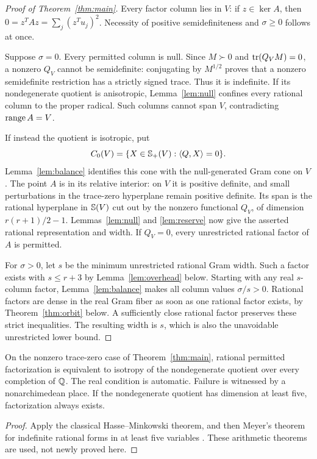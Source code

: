 \begin{proof}[Proof of Theorem~\ref{thm:main}]
Every factor column lies in $V$: if $z\in\ker A$, then $0=z^TAz=\sum_j(z^Tu_j)^2$. Necessity of positive semidefiniteness and $\sigma\geq0$ follows at once.

Suppose $\sigma=0$. Every permitted column is null. Since $M\succ0$ and $\operatorname{tr}(Q_VM)=0$, a nonzero $Q_V$ cannot be semidefinite: conjugating by $M^{1/2}$ proves that a nonzero semidefinite restriction has a strictly signed trace. Thus it is indefinite. If its nondegenerate quotient is anisotropic, Lemma~\ref{lem:null} confines every rational column to the proper radical. Such columns cannot span $V$, contradicting $\operatorname{range} A=V$.

If instead the quotient is isotropic, put
\[
 C_0(V)=\{X\in\mathbb S_+(V):\langle Q,X\rangle=0\}.
\]
Lemma~\ref{lem:balance} identifies this cone with the null-generated Gram cone on $V$. The point $A$ is in its relative interior: on $V$ it is positive definite, and small perturbations in the trace-zero hyperplane remain positive definite. Its span is the rational hyperplane in $\mathbb S(V)$ cut out by the nonzero functional $Q_V$, of dimension $r(r+1)/2-1$. Lemmas~\ref{lem:null} and \ref{lem:reserve} now give the asserted rational representation and width. If $Q_V=0$, every unrestricted rational factor of $A$ is permitted.

For $\sigma>0$, let $s$ be the minimum unrestricted rational Gram width. Such a factor exists with $s\leq r+3$ by Lemma~\ref{lem:overhead} below. Starting with any real $s$-column factor, Lemma~\ref{lem:balance} makes all column values $\sigma/s>0$. Rational factors are dense in the real Gram fiber as soon as one rational factor exists, by Theorem~\ref{thm:orbit} below. A sufficiently close rational factor preserves these strict inequalities. The resulting width is $s$, which is also the unavoidable unrestricted lower bound.
\end{proof}

\begin{corollary}\label{cor:localglobal}
On the nonzero trace-zero case of Theorem~\ref{thm:main}, rational permitted factorization is equivalent to isotropy of the nondegenerate quotient over every completion of $\mathbb Q$. The real condition is automatic. Failure is witnessed by a nonarchimedean place. If the nondegenerate quotient has dimension at least five, factorization always exists.
\end{corollary}
\begin{proof}
Apply the classical Hasse--Minkowski theorem, and then Meyer's theorem for indefinite rational forms in at least five variables \cite{CasselsBook}. These arithmetic theorems are used, not newly proved here.
\end{proof}

